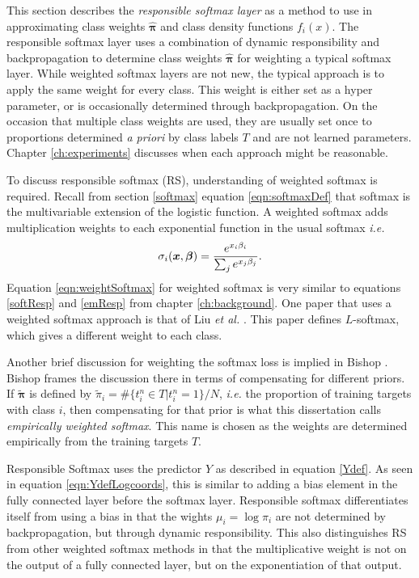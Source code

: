 \label{sect:LayerDesc}
This section describes the \textit{responsible softmax layer} as a method to use \DR in approximating class weights \( \hat{\bm \pi} \) and class density functions \( f_i(x) \). The responsible softmax layer uses a combination of dynamic responsibility and backpropagation to determine class weights \( \hat{\bm \pi} \) for weighting a typical softmax layer.  While weighted softmax layers are not new, the typical approach is to apply the same weight for every class.  This weight is either set as a hyper parameter, or is occasionally determined through backpropagation.  On the occasion that multiple class weights are used, they are usually set once to proportions determined \textit{a priori} by class labels \( T \) and are not learned parameters.  Chapter \ref{ch:experiments} discusses when each approach might be reasonable.

To discuss responsible softmax (RS), understanding of weighted softmax is required.  Recall from section \ref{softmax} equation \ref{eqn:softmaxDef} that softmax is the multivariable extension of the logistic function. A weighted softmax adds multiplication weights to each exponential function in the usual softmax \textit{i.e.}
\begin{equation}\label{eqn:weightSoftmax}
\sigma_i(\bm x,\bm{\beta}) = \dfrac{e^{x_i\beta_i}}{\sum_j e^{x_j\beta_j}}.
\end{equation}
Equation \ref{eqn:weightSoftmax} for weighted softmax is very similar to equations \ref{softResp} and \ref{emResp} from chapter \ref{ch:background}. One paper that uses a weighted softmax approach is that of Liu \textit{et al.} \cite{liu2016large}. This paper defines \( L \)-softmax, which gives a different weight to each class. 

Another brief discussion for weighting the softmax loss is implied in Bishop \cite[sect. 6.5]{Bishop1995}.  Bishop frames the discussion there in terms of compensating for different priors.  If \( \tilde{\!\bm\pi} \) is defined by \( \tilde{\!\pi}_i = \#\{t_i^{n}\in T|t_i^{n}=1\}/N \), \textit{i.e.} the proportion of training targets with class \( i \), then compensating for that prior is what this dissertation calls \textit{empirically weighted softmax}.  This name is chosen as the weights are determined empirically from the training targets \( T \).

Responsible Softmax uses the predictor \( Y \) as described in equation \ref{Ydef}.  As seen in equation \ref{eqn:YdefLogcoords}, this is similar to adding a bias element in the fully connected layer before the softmax layer. Responsible softmax differentiates itself from using a bias in that the wights \( \mu_i = \log\pi_i \) are not determined by backpropagation, but through dynamic responsibility.  This also distinguishes RS from other weighted softmax methods in that the multiplicative weight is not on the output of a fully connected layer, but on the exponentiation of that output.

